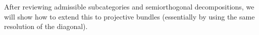 After reviewing admissible subcategories and semiorthogonal decompositions, we will show how to extend this to projective bundles (essentially by using the same resolution of the diagonal).





